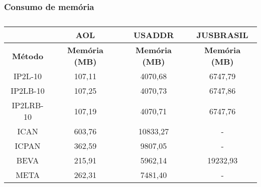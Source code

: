 \subsubsection{Consumo de memória}

\begin{table}[]
\centering
\begin{tabular}{c|c|c|c|}
\cline{2-4}
\multicolumn{1}{l|}{} & \textbf{AOL} & \textbf{USADDR} & \textbf{JUSBRASIL} \\ \hline
\multicolumn{1}{|c|}{\textbf{Método}} & \textbf{Memória (MB)} & \textbf{Memória (MB)} & \textbf{Memória (MB)} \\ \hline
\multicolumn{1}{|c|}{IP2L-10} & 107,11 & 4070,68 & 6747,79 \\ \hline
\multicolumn{1}{|c|}{IP2LB-10} & 107,25 & 4070,73 & 6747,86 \\ \hline
\multicolumn{1}{|c|}{IP2LRB-10} & 107,19 & 4070,71 & 6747,76 \\ \hline
\multicolumn{1}{|c|}{ICAN} & 603,76 & 10833,27 & - \\ \hline
\multicolumn{1}{|c|}{ICPAN} & 362,59 & 9807,05 & - \\ \hline
\multicolumn{1}{|c|}{BEVA} & 215,91 & 5962,14 & 19232,93 \\ \hline
\multicolumn{1}{|c|}{META} & 262,31 & 7481,40 & - \\ \hline
\end{tabular}
\caption{}
\label{tab:baselines-memory-consumption}
\end{table}
